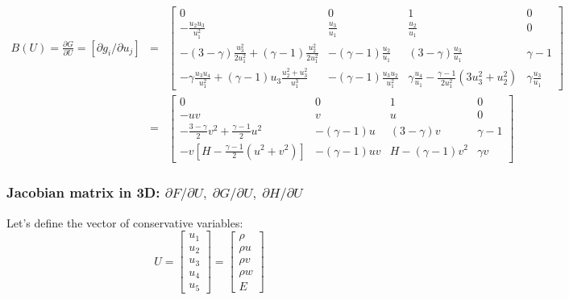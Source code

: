\documentclass{article}
\begin{document}
\begin{eqnarray}
  B(U) = \frac{\partial G}{\partial U} = \left[ \partial g_i/\partial u_j \right] & = & \left[
    \begin{array}{cccc}
      0 & 0 & 1 & 0\\
      -\frac{u_2 u_3}{u_1^2} & \frac{u_3}{u_1} & \frac{u_2}{u_1} & 0\\
      -(3-\gamma)\frac{u_3^2}{2 u_1^2} + (\gamma-1)\frac{u_2^2}{2 u_1^2} & -(\gamma-1)\frac{u_2}{u_1} & (3-\gamma) \frac{u_3}{u_1} & \gamma-1\\
       -\gamma\frac{u_3 u_4}{u_1^2} + (\gamma-1)u_3 \frac{u_2^2+u_3^2}{u_1^3} & -(\gamma-1)\frac{u_3 u_2}{u_1^2} & \gamma \frac{u_4}{u_1} -\frac{\gamma-1}{2 u_1^2} (3u_3^2+u_2^2) &\gamma \frac{u_3}{u_1}
    \end{array}
  \right]\\
  &=& \left[
    \begin{array}{cccc}
      0 & 0 & 1 & 0\\
      -u v & v & u & 0\\
      -\frac{3-\gamma}{2}v^2+\frac{\gamma-1}{2}u^2 & -(\gamma-1)u  & (3-\gamma) v & \gamma-1\\
      - v [H-\frac{\gamma-1}{2} (u^2+v^2) ] & -(\gamma-1)uv & H-(\gamma-1)v^2 &\gamma v
    \end{array}
  \right]
\end{eqnarray}

\subsubsection*{Jacobian matrix in 3D: \boldmath $\partial F/\partial U, \; \partial G/\partial U, \; \partial H/\partial U$}

Let's define the vector of conservative variables:
\begin{equation}
  U = \left[
    \begin{array}{c}
      u_1\\
      u_2\\
      u_3\\
      u_4\\
      u_5
    \end{array}
  \right] = \left[
    \begin{array}{c}
      \rho\\
      \rho u\\
      \rho v\\
      \rho w\\
      E
    \end{array}
  \right]
\end{equation}
\end{document}
